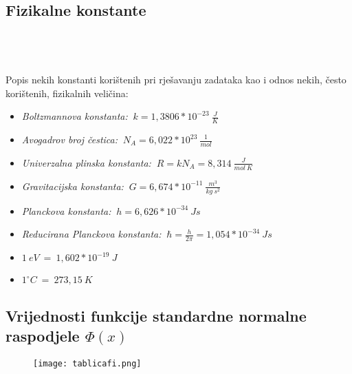 \documentclass[a4paper,12pt]{article}
\begin{document}
\subsection{Fizikalne konstante}
\\
\\
\\
Popis nekih konstanti kori\v{s}tenih pri rje\v{s}avanju zadataka kao i odnos nekih, \v{c}esto kori\v{s}tenih, fizikalnih veli\v{c}ina:
\begin{itemize}
	\item \textit{Boltzmannova konstanta:} $\ k=1,3806*10^{-23}\ \frac{J}{K}$
	\\
	\item \textit{Avogadrov broj \v{c}estica:} $\ N_A=6,022*10^{23}\ \frac{1}{mol}$
	\\
	\item \textit{Univerzalna plinska konstanta:} $\ R=kN_A=8,314\ \frac{J}{mol\ K}$
	\\
	\item \textit{Gravitacijska konstanta:} $\ G=6,674*10^{-11}\ \frac{m^3}{kg\ s^2}$
	\\
	\item \textit{Planckova konstanta:} $\ h=6,626*10^{-34}\ Js$
	\\
	\item \textit{Reducirana Planckova konstanta:} $\ \hbar=\frac{h}{2 \pi}=1,054*10^{-34}\ Js$
	\\
	\item $1\ eV\ =\ 1,602*10^{-19}\ J$
	\\
	\item $1^{\circ}C\ =\ 273,15\ K$
\end{itemize}

\newpage
\subsection{Vrijednosti funkcije standardne normalne raspodjele $\Phi(x)$}

 \begin{figure}[h!]
        \centering
	\texttt{[image: tablicafi.png]}
 \end{figure}

\newpage
\end{document}
